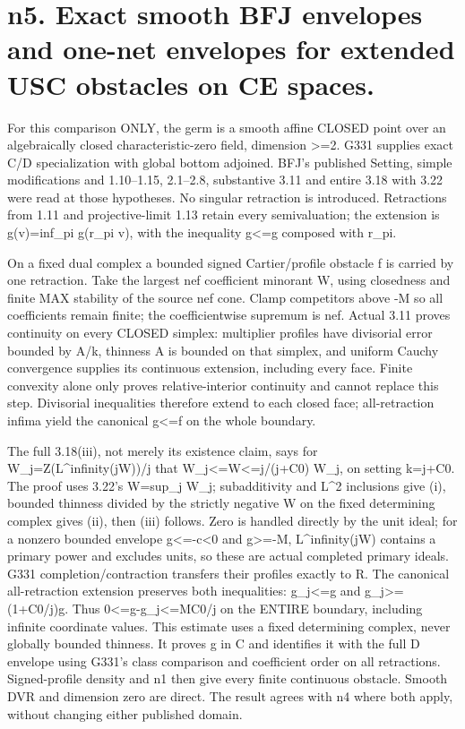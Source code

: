 \documentclass[11pt]{article}
\begin{document}
\section*{n5. Exact smooth BFJ envelopes and one-net envelopes for extended USC obstacles on CE spaces.}
For this comparison ONLY, the germ is a smooth affine CLOSED point over an algebraically closed characteristic-zero field, dimension >=2. G331 supplies exact C/D specialization with global bottom adjoined. BFJ's published Setting, simple modifications and 1.10--1.15, 2.1--2.8, substantive 3.11 and entire 3.18 with 3.22 were read at those hypotheses. No singular retraction is introduced. Retractions from 1.11 and projective-limit 1.13 retain every semivaluation; the extension is g(v)=inf\_pi g(r\_pi v), with the inequality g<=g composed with r\_pi.

On a fixed dual complex a bounded signed Cartier/profile obstacle f is carried by one retraction. Take the largest nef coefficient minorant W, using closedness and finite MAX stability of the source nef cone. Clamp competitors above -M so all coefficients remain finite; the coefficientwise supremum is nef. Actual 3.11 proves continuity on every CLOSED simplex: multiplier profiles have divisorial error bounded by A/k, thinness A is bounded on that simplex, and uniform Cauchy convergence supplies its continuous extension, including every face. Finite convexity alone only proves relative-interior continuity and cannot replace this step. Divisorial inequalities therefore extend to each closed face; all-retraction infima yield the canonical g<=f on the whole boundary.

The full 3.18(iii), not merely its existence claim, says for W\_j=Z(L\textasciicircum{}infinity(jW))/j that W\_j<=W<=j/(j+C0) W\_j, on setting k=j+C0. The proof uses 3.22's W=sup\_j W\_j; subadditivity and L\textasciicircum{}2 inclusions give (i), bounded thinness divided by the strictly negative W on the fixed determining complex gives (ii), then (iii) follows. Zero is handled directly by the unit ideal; for a nonzero bounded envelope g<=-c<0 and g>=-M, L\textasciicircum{}infinity(jW) contains a primary power and excludes units, so these are actual completed primary ideals. G331 completion/contraction transfers their profiles exactly to R. The canonical all-retraction extension preserves both inequalities: g\_j<=g and g\_j>=(1+C0/j)g. Thus 0<=g-g\_j<=MC0/j on the ENTIRE boundary, including infinite coordinate values. This estimate uses a fixed determining complex, never globally bounded thinness. It proves g in C and identifies it with the full D envelope using G331's class comparison and coefficient order on all retractions. Signed-profile density and n1 then give every finite continuous obstacle. Smooth DVR and dimension zero are direct. The result agrees with n4 where both apply, without changing either published domain.
\end{document}
